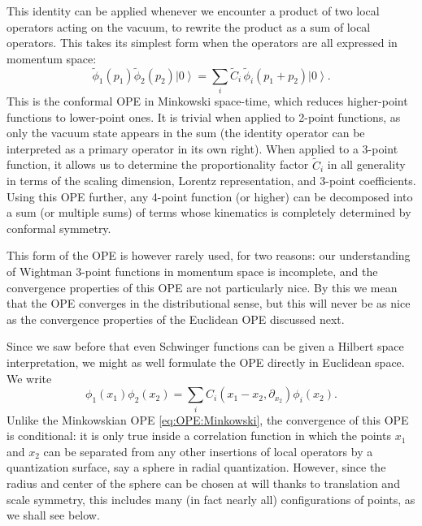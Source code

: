 \documentclass[a4paper,12pt]{article}
\newcommand{\ket}[1]{\left| #1 \right\rangle}
\numberwithin{equation}{section}
\begin{document}
This identity can be applied whenever we encounter a product of two local operators acting on the vacuum, to rewrite the product as a sum of local operators. This takes its simplest form when the operators are all expressed in momentum space:
\begin{equation}
	\widetilde{\phi}_1(p_1) \widetilde{\phi}_2(p_2) \ket{0}
	= \sum_i \widetilde{C}_i \, \widetilde{\phi}_i(p_1 + p_2) \ket{0}.
	\label{eq:OPE:Minkowski}
\end{equation}
This is the conformal OPE in Minkowski space-time, which reduces higher-point functions to lower-point ones. It is trivial when applied to 2-point functions, as only the vacuum state appears in the sum (the identity operator can be interpreted as a primary operator in its own right). When applied to a 3-point function, it allows us to determine the proportionality factor $\widetilde{C}_i$ in all generality in terms of the scaling dimension, Lorentz representation, and 3-point coefficients. Using this OPE further, any 4-point function (or higher) can be decomposed into a sum (or multiple sums) of terms whose kinematics is completely determined by conformal symmetry.

This form of the OPE is however rarely used, for two reasons: our understanding of Wightman 3-point functions in momentum space is incomplete, and the convergence properties of this OPE are not particularly nice. By this we mean that the OPE converges in the distributional sense, but this will never be as nice as the convergence properties of the Euclidean OPE discussed next.

Since we saw before that even Schwinger functions can be given a Hilbert space interpretation, we might as well formulate the OPE directly in Euclidean space. We write
\begin{equation}
	\phi_1(x_1) \phi_2(x_2) = \sum_i
	C_i\left( x_1 - x_2, \partial_{x_2} \right) \phi_i(x_2).
	\label{eq:OPE:Euclidean}
\end{equation}
Unlike the Minkowskian OPE \eqref{eq:OPE:Minkowski}, the convergence of this OPE is conditional: it is only true inside a correlation function in which the points $x_1$ and $x_2$ can be separated from any other insertions of local operators by a quantization surface, say a sphere in radial quantization. However, since the radius and center of the sphere can be chosen at will thanks to translation and scale symmetry, this includes many (in fact nearly all) configurations of points, as we shall see below.
\end{document}
